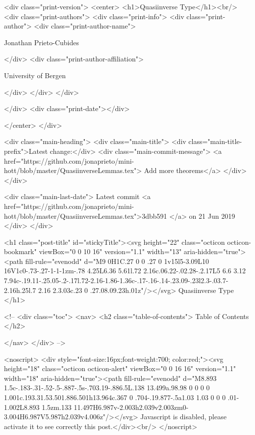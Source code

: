   <div class="print-version">
    <center>
      <h1>Quasiinverse Type</h1><br/>
        <div class="print-authors">
          <div class="print-info">
            <div class="print-author">
              <div class="print-author-name">
                
                  Jonathan Prieto-Cubides
                
              </div>
              <div class="print-author-affiliation">
                
                  University of Bergen
                
                </div>
            </div>
          </div>
          
          
        </div>
        <div class="print-date"></div>
        
        
    </center>
  </div>

  
  <div class="main-heading">
    <div class="main-title">
      <div class="main-title-prefix">Latest change:</div>
      <div class="main-commit-message">
            <a href="https://github.com/jonaprieto/mini-hott/blob/master/QuasiinverseLemmas.tex">
              Add more theorems</a>
      </div>
    </div>

    <div class="main-last-date">
      Latest commit <a href="https://github.com/jonaprieto/mini-hott/blob/master/QuasiinverseLemmas.tex">3dbb591 </a> on  21 Jun 2019
    </div>
  </div>
  
  <h1 class="post-title" id="stickyTitle"><svg height="22" class="octicon octicon-bookmark" viewBox="0 0 10 16" version="1.1" width="13" aria-hidden="true"><path fill-rule="evenodd" d="M9 0H1C.27 0 0 .27 0 1v15l5-3.09L10 16V1c0-.73-.27-1-1-1zm-.78 4.25L6.36 5.61l.72 2.16c.06.22-.02.28-.2.17L5 6.6 3.12 7.94c-.19.11-.25.05-.2-.17l.72-2.16-1.86-1.36c-.17-.16-.14-.23.09-.23l2.3-.03.7-2.16h.25l.7 2.16 2.3.03c.23 0 .27.08.09.23h.01z"/></svg> Quasiinverse Type
  </h1>

  <!-- 
  <div class="toc">
    <nav>
    <h2 class="table-of-contents"> Table of Contents </h2>
      

    </nav>
  </div>
   -->

  <noscript>
  <div style="font-size:16px;font-weight:700; color:red;"><svg height="18" class="octicon octicon-alert" viewBox="0 0 16 16" version="1.1" width="18" aria-hidden="true"><path fill-rule="evenodd" d="M8.893 1.5c-.183-.31-.52-.5-.887-.5s-.703.19-.886.5L.138 13.499a.98.98 0 0 0 0 1.001c.193.31.53.501.886.501h13.964c.367 0 .704-.19.877-.5a1.03 1.03 0 0 0 .01-1.002L8.893 1.5zm.133 11.497H6.987v-2.003h2.039v2.003zm0-3.004H6.987V5.987h2.039v4.006z"/></svg> Javascript is disabled, please activate it to see correctly this post.</div><br/>
  </noscript>

